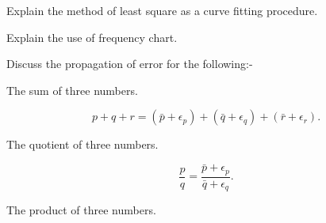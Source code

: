 \item Explain the method of least square as a curve fitting procedure.

\item Explain the use of frequency chart.


\markB

\partCo


\item \iitem Discuss the propagation of error for the following:-

\iitem The sum of three numbers.

\[p + q + r = ( \bar{p} + \epsilon_p ) + ( \bar{q} + \epsilon_q) + (\bar{r} + \epsilon_r).\]

\item The quotient of three numbers.

\[ \frac{p}{q} = \frac{\bar{p} + \epsilon_p}{\bar{q} + \epsilon_q}.\]

\item The product of three numbers.

\newpage

\again

\ene
\ene
\ene
